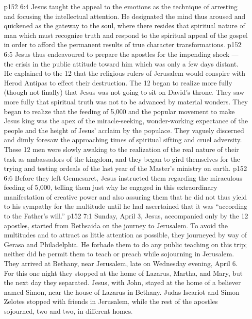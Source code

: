 \vs p152 6:4 \pc Jesus taught the appeal to the emotions as the technique of arresting and focusing the intellectual attention. He designated the mind thus aroused and quickened as the gateway to the soul, where there resides that spiritual nature of man which must recognize truth and respond to the spiritual appeal of the gospel in order to afford the permanent results of true character transformations.
\vs p152 6:5 Jesus thus endeavoured to prepare the apostles for the impending shock --- the crisis in the public attitude toward him which was only a few days distant. He explained to the 12 that the religious rulers of Jerusalem would conspire with Herod Antipas to effect their destruction. The 12 began to realize more fully (though not finally) that Jesus was not going to sit on David’s throne. They saw more fully that spiritual truth was not to be advanced by material wonders. They began to realize that the feeding of 5,000 and the popular movement to make Jesus king was the apex of the miracle\hyp{}seeking, wonder\hyp{}working expectance of the people and the height of Jesus’ acclaim by the populace. They vaguely discerned and dimly foresaw the approaching times of spiritual sifting and cruel adversity. These 12 men were slowly awaking to the realization of the real nature of their task as ambassadors of the kingdom, and they began to gird themselves for the trying and testing ordeals of the last year of the Master’s ministry on earth.
\vs p152 6:6 \pc Before they left Gennesaret, Jesus instructed them regarding the miraculous feeding of 5,000, telling them just why he engaged in this extraordinary manifestation of creative power and also assuring them that he did not thus yield to his sympathy for the multitude until he had ascertained that it was “according to the Father’s will.”
\vs p152 7:1 Sunday, April 3, Jesus, accompanied only by the 12 apostles, started from Bethsaida on the journey to Jerusalem. To avoid the multitudes and to attract as little attention as possible, they journeyed by way of Gerasa and Philadelphia. He forbade them to do any public teaching on this trip; neither did he permit them to teach or preach while sojourning in Jerusalem. They arrived at Bethany, near Jerusalem, late on Wednesday evening, April 6. For this one night they stopped at the home of Lazarus, Martha, and Mary, but the next day they separated. Jesus, with John, stayed at the home of a believer named Simon, near the house of Lazarus in Bethany. Judas Iscariot and Simon Zelotes stopped with friends in Jerusalem, while the rest of the apostles sojourned, two and two, in different homes.
